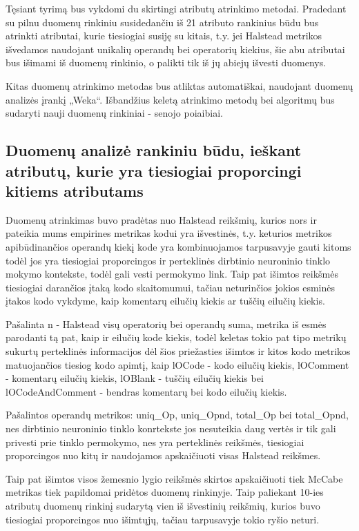 \documentclass{VUMIFPSbakalaurinis}
\begin{document}
Tęsiant tyrimą bus vykdomi du skirtingi atributų atrinkimo metodai. Pradedant su pilnu duomenų rinkiniu susidedančiu iš 21 atributo rankinius būdu bus atrinkti atributai, kurie tiesiogiai susiję su kitais, t.y. jei Halstead metrikos išvedamos naudojant unikalių operandų bei operatorių kiekius, šie abu atributai bus išimami iš duomenų rinkinio, o palikti tik iš jų abiejų išvesti duomenys.

Kitas duomenų atrinkimo metodas bus atliktas automatiškai, naudojant duomenų analizės įrankį „Weka“. Išbandžius keletą atrinkimo metodų bei algoritmų bus sudaryti nauji duomenų rinkiniai - senojo poiaibiai.

\subsection{Duomenų analizė rankiniu būdu, ieškant atributų, kurie yra tiesiogiai proporcingi kitiems atributams}

Duomenų atrinkimas buvo pradėtas nuo Halstead reikšmių, kurios nors ir pateikia mums empirines metrikas kodui yra išvestinės, t.y. keturios metrikos apibūdinančios operandų kiekį kode yra kombinuojamos tarpusavyje gauti kitoms todėl jos yra tiesiogiai proporcingos ir perteklinės dirbtinio neuroninio tinklo mokymo kontekste, todėl gali vesti permokymo link. Taip pat išimtos reikšmės tiesiogiai darančios įtaką kodo skaitomumui, tačiau neturinčios jokios esminės įtakos kodo vykdyme, kaip komentarų eilučių kiekis ar tuščių eilučių kiekis.

Pašalinta n - Halstead visų operatorių bei operandų suma, metrika iš esmės parodanti tą pat, kaip ir eilučių kode kiekis, todėl keletas tokio pat tipo metrikų sukurtų perteklinės informacijos dėl šios priežasties išimtos ir kitos kodo metrikos matuojančios tiesiog kodo apimtį, kaip lOCode - kodo eilučių kiekis, lOComment - komentarų eilučių kiekis, lOBlank - tuščių eilučių kiekis bei lOCodeAndComment - bendras komentarų bei kodo eilučių kiekis.

Pašalintos operandų metrikos: uniq\_Op, uniq\_Opnd, total\_Op bei total\_Opnd, nes dirbtinio neuroninio tinklo konrtekste jos nesuteikia daug vertės ir tik gali privesti prie tinklo permokymo, nes yra perteklinės reikšmės, tiesiogiai proporcingos nuo kitų ir naudojamos apskaičiuoti visas Halstead reikšmes.

Taip pat išimtos visos žemesnio lygio reikšmės skirtos apskaičiuoti tiek McCabe metrikas tiek papildomai pridėtos duomenų rinkinyje. Taip paliekant 10-ies atributų duomenų rinkinį sudarytą vien iš išvestinių reikšmių, kurios buvo tiesiogiai proporcingos nuo išimtųjų, tačiau tarpusavyje tokio ryšio neturi.
\end{document}
